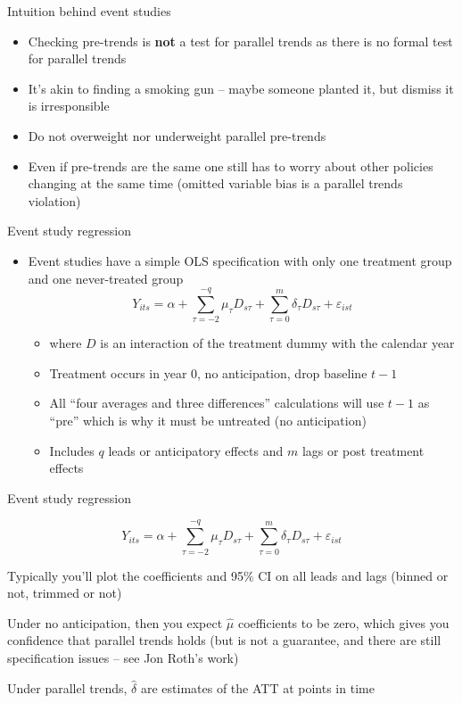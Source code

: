 \documentclass{beamer}
\begin{document}
\begin{frame}{Intuition behind event studies}
	
	\begin{itemize}
	\item Checking pre-trends is \textbf{not} a test for parallel trends as there is no formal test for parallel trends
	\item It's akin to finding a smoking gun -- maybe someone planted it, but dismiss it is irresponsible
	\item Do not overweight nor underweight parallel pre-trends
	\item Even if pre-trends are the same one still has to worry about other policies changing at the same time (omitted variable bias is a parallel trends violation)

\end{itemize}

\end{frame}


\begin{frame}{Event study regression}
	
	\begin{itemize}
	\item Event studies have a simple OLS specification with only one treatment group and one never-treated group $$Y_{its} = \alpha +  \sum_{\tau=-2}^{-q}\mu_{\tau}D_{s\tau} + \sum_{\tau=0}^m\delta_{\tau}D_{s\tau}+\varepsilon_{ist}$$
		\begin{itemize}
		\item where $D$ is an interaction of the treatment dummy with the calendar year 
		\item Treatment occurs in year 0, no anticipation, drop baseline $t-1$
		\item All ``four averages and three differences'' calculations will use $t-1$ as ``pre'' which is why it must be untreated (no anticipation)
		\item Includes $q$ leads or anticipatory effects and $m$ lags or post treatment effects
		\end{itemize}
	\end{itemize}
\end{frame}

\begin{frame}{Event study regression}


$$Y_{its} = \alpha + \sum_{\tau=-2}^{-q}\mu_{\tau}D_{s\tau} + \sum_{\tau=0}^m\delta_{\tau}D_{s\tau}+\varepsilon_{ist}$$

\bigskip

Typically you'll plot the coefficients and 95\% CI on all leads and lags (binned or not, trimmed or not) 

\bigskip

Under no anticipation, then you expect $\widehat{\mu}$ coefficients to be zero, which gives you confidence that parallel trends holds (but is not a guarantee, and there are still specification issues -- see Jon Roth's work)

\bigskip

Under parallel trends, $\widehat{\delta}$ are estimates of the ATT at points in time

\end{frame}
\end{document}
